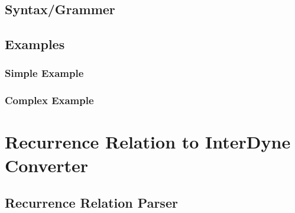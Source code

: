 \documentclass{article}
\begin{document}


\subsection{Syntax/Grammer}

\subsection{Examples}
\subsubsection{Simple Example}
\subsubsection{Complex Example}

\section{Recurrence Relation to InterDyne Converter} 





\subsection{Recurrence Relation Parser}
\end{document}
